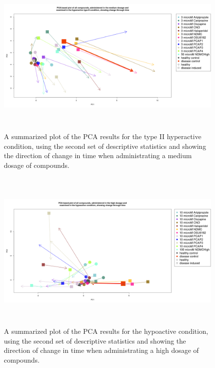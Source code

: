 \documentclass[a4paper,12pt]{article}
\begin{document}
\newpage
\begin{figure}[h!]
\begin{center}
\includegraphics[width=16cm,height=8cm]{All_together_3_microM_DarkPTZ_in_time_set2.png}
\caption{A summarized plot of the PCA results for the type II hyperactive condition, using the second set of descriptive statistics and showing the direction of change in time when administrating a medium dosage of compounds.}
\end{center}
\end{figure}
\newpage
\begin{figure}[h!]
\begin{center}
\includegraphics[width=16cm,height=8cm]{All_together_10_microM_DarkApoLow_in_time_set2.png}
\caption{A summarized plot of the PCA results for the hypoactive condition, using the second set of descriptive statistics and showing the direction of change in time when administrating a high dosage of compounds.}
\end{center}
\end{figure}
\end{document}
